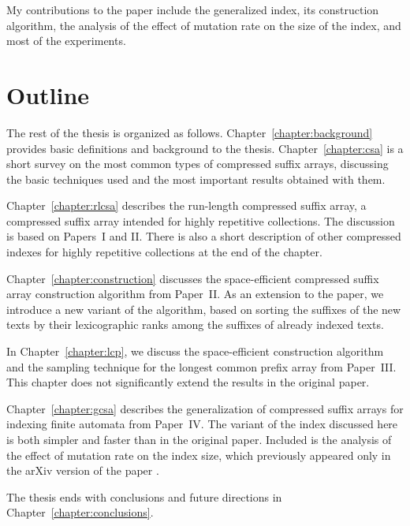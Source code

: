 My contributions to the paper include the generalized index, its construction algorithm, the analysis of the effect of mutation rate on the size of the index, and most of the experiments.


\section{Outline}

The rest of the thesis is organized as follows. Chapter~\ref{chapter:background} provides basic definitions and background to the thesis. Chapter~\ref{chapter:csa} is a short survey on the most common types of compressed suffix arrays, discussing the basic techniques used and the most important results obtained with them.

Chapter~\ref{chapter:rlcsa} describes the run-length compressed suffix array, a compressed suffix array intended for highly repetitive collections. The discussion is based on Papers~I and II. There is also a short description of other compressed indexes for highly repetitive collections at the end of the chapter.

Chapter~\ref{chapter:construction} discusses the space-efficient compressed suffix array construction algorithm from Paper~II. As an extension to the paper, we introduce a new variant of the algorithm, based on sorting the suffixes of the new texts by their lexicographic ranks among the suffixes of already indexed texts.

In Chapter~\ref{chapter:lcp}, we discuss the space-efficient construction algorithm and the sampling technique for the longest common prefix array from Paper~III. This chapter does not significantly extend the results in the original paper.

Chapter~\ref{chapter:gcsa} describes the generalization of compressed suffix arrays for indexing finite automata from Paper~IV. The variant of the index discussed here is both simpler and faster than in the original paper. Included is the analysis of the effect of mutation rate on the index size, which previously appeared only in the arXiv version of the paper \cite{Siren2011a}.

The thesis ends with conclusions and future directions in Chapter~\ref{chapter:conclusions}.
